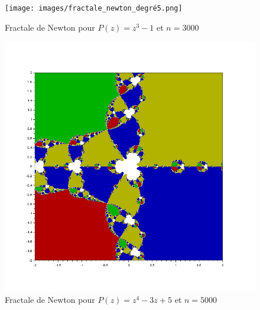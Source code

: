            \begin{figure}[h]
                \centering
                \begin{minipage}[b]{0.3\textwidth}
                    \texttt{[image: images/fractale\_newton\_degré5.png]}
                    \caption{Fractale de Newton pour $P(z) = z^3-1$ et $n=3000$}
                    \label{fig:fractale_newton2}
                \end{minipage}
                \hfill
                \begin{minipage}[b]{0.3\textwidth}
                    \includegraphics[width=\textwidth]{images/fractale_newton_z4-3z+5.png}
                    \caption{Fractale de Newton pour $P(z) = z^4-3z+5$ et $n=5000$}
                    \label{fig:fractale_newton3}
                \end{minipage}
                \hfill
                \begin{minipage}[b]{0.3\textwidth}

\end{minipage}
\end{figure}
